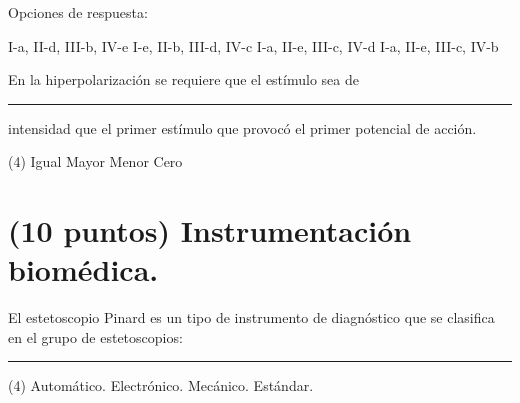 \documentclass[12pt, letter]{exam}
\begin{document}
\begin{questions}
\begin{multicols}{2}
    \end{multicols}

    Opciones de respuesta:
    \begin{multicols}{2}
    \begin{tasks}
        \task I-a, II-d, III-b, IV-e
        \task I-e, II-b, III-d, IV-c
        \task I-a, II-e, III-c, IV-d
        \task I-a, II-e, III-c, IV-b
    \end{tasks}
    \end{multicols}
    \question En la hiperpolarización se requiere que el estímulo sea de \rule{2cm}{0.1mm} intensidad que el primer estímulo que provocó el primer potencial de acción.
    \begin{tasks}(4)
        \task Igual
        \task Mayor
        \task Menor
        \task Cero
    \end{tasks} 

    \section{(10 puntos) Instrumentación biomédica.}

    \question El estetoscopio Pinard es un tipo de instrumento de diagnóstico que se clasifica en el grupo de estetoscopios: \rule{2cm}{0.1mm}
    \begin{tasks}(4)
        \task Automático.
        \task Electrónico.
        \task Mecánico.
        \task Estándar.
    \end{tasks}


\end{questions}
\end{document}
